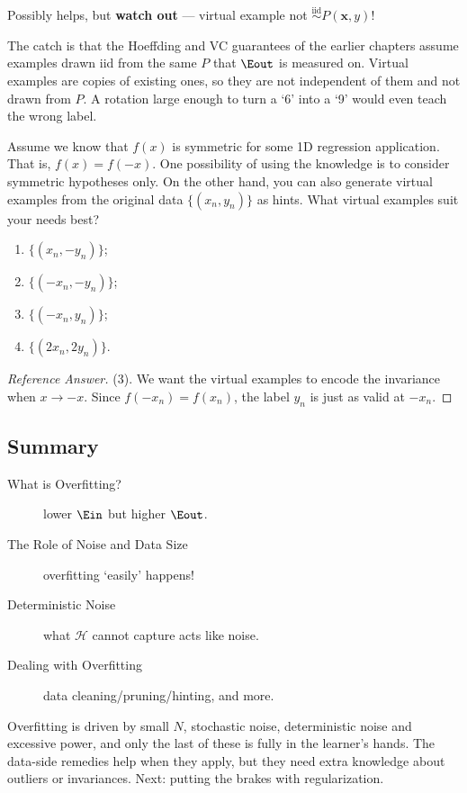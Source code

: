 \begin{moral}
    Possibly helps, but \textbf{watch out} --- virtual example not
    \(\overset{\mathrm{iid}}{\sim} P(\bm{x}, y)\)!
\end{moral}

The catch is that the Hoeffding and VC guarantees of the earlier chapters
assume examples drawn iid from the same \(P\) that \(\Eout\) is measured on.
Virtual examples are copies of existing ones, so they are not independent of
them and not drawn from \(P\). A rotation large enough to turn a `6' into a
`9' would even teach the wrong label.

\begin{exercise}
    Assume we know that \(f(x)\) is symmetric for some 1D regression
    application. That is, \(f(x) = f(-x)\). One possibility of using the
    knowledge is to consider symmetric hypotheses only. On the other hand, you
    can also generate virtual examples from the original data \(\{(x_n,
    y_n)\}\) as hints. What virtual examples suit your needs best?
    \begin{enumerate}[(1)]
        \item \(\{(x_n, -y_n)\}\);
        \item \(\{(-x_n, -y_n)\}\);
        \item \(\{(-x_n, y_n)\}\);
        \item \(\{(2x_n, 2y_n)\}\).
    \end{enumerate}
\end{exercise}

\begin{proof}[Reference Answer]
    (3). We want the virtual examples to encode the invariance when \(x \to
    -x\). Since \(f(-x_n) = f(x_n)\), the label \(y_n\) is just as valid at
    \(-x_n\).
\end{proof}

\hrulebar

\subsection*{Summary}

\begin{description}
    \item[What is Overfitting?] lower \(\Ein\) but higher \(\Eout\).
    \item[The Role of Noise and Data Size] overfitting `easily' happens!
    \item[Deterministic Noise] what \(\mathcal{H}\) cannot capture acts like
        noise.
    \item[Dealing with Overfitting] data cleaning/pruning/hinting, and more.
\end{description}

Overfitting is driven by small \(N\), stochastic noise, deterministic noise and
excessive power, and only the last of these is fully in the learner's hands.
The data-side remedies help when they apply, but they need extra knowledge
about outliers or invariances. Next: putting the brakes with regularization.

